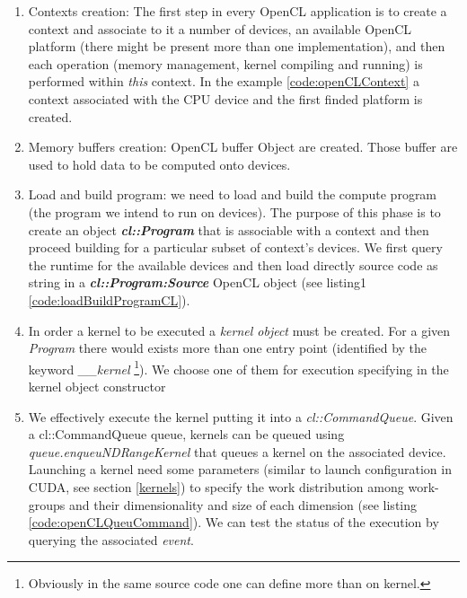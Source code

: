   \begin{enumerate}
    \item Contexts creation: The first step in every OpenCL application is to
    create a context and associate to it a number of devices, an available
    OpenCL platform (there might be present more than one implementation), and
    then each operation (memory management, kernel compiling and running) is
    performed within \emph{this} context. In the example
    \ref{code:openCLContext} a context associated with the CPU device and the
    first finded platform is created.\\
    
    \item Memory buffers creation: OpenCL buffer Object are created. Those
    buffer are used to hold data to be computed onto devices.\\
    
    \item Load and build program: we need to load and build the compute program
    (the program we intend to run on devices). The purpose of this phase is to
    create an object \textbf{\textit{cl::Program}} that is associable with a
    context and then proceed building for a particular subset of
    context's devices. We first query the runtime for the available devices and
    then load directly source code as string in a
    \textbf{\textit{cl::Program:Source}} OpenCL object (see listing1
    \ref{code:loadBuildProgramCL}).\\

\item In order a kernel to be executed a \emph{kernel object} must be created.
	For a given \emph{Program} there would exists more than one entry point
	(identified by the keyword \emph{\_\_kernel} \footnote{Obviously in the same
	source code one can define more than on kernel.}). We choose one of them for
	execution specifying in the kernel object constructor\\

\item We effectively execute the kernel putting it into a 
\emph{cl::CommandQueue}. Given a cl::CommandQueue queue, kernels can be queued
using \textit{queue.enqueu\-NDRangeKernel} that queues a kernel on
the associated device.
Launching a kernel need some parameters (similar to launch configuration in
CUDA, see section \ref{kernels}) to specify the work distribution among
work-groups and their dimensionality and size of each dimension (see listing
\ref{code:openCLQueuCommand}). We can test the status of the execution by
querying the associated \emph{event}.\\
  \end{enumerate}
  
